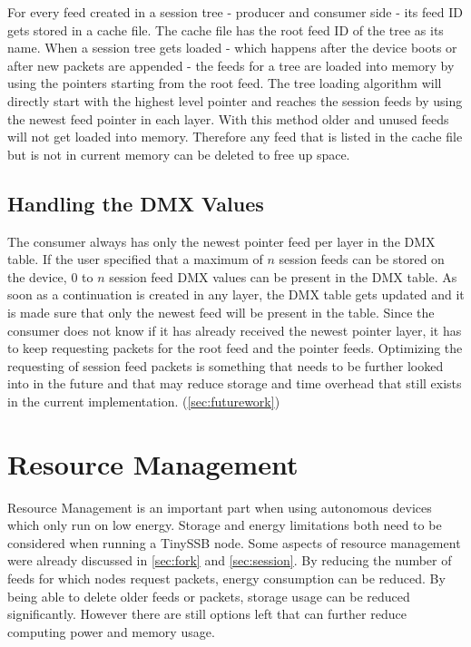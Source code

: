 For every feed created in a session tree - producer and consumer side - its feed ID gets stored in a cache file. The cache file has the root feed ID of the tree as its name. When a session tree gets loaded - which happens after the device boots or after new packets are appended - the feeds for a tree are loaded into memory by using the pointers starting from the root feed. The tree loading algorithm will directly start with the highest level pointer and reaches the session feeds by using the newest feed pointer in each layer. With this method older and unused feeds will not get loaded into memory. Therefore any feed that is listed in the cache file but is not in current memory can be deleted to free up space.


\subsection{Handling the DMX Values}
The consumer always has only the newest pointer feed per layer in the DMX table. If the user specified that a maximum of $n$ session feeds can be stored on the device, 0 to $n$ session feed DMX values can be present in the DMX table. As soon as a continuation is created in any layer, the DMX table gets updated and it is made sure that only the newest feed will be present in the table. Since the consumer does not know if it has already received the newest pointer layer, it has to keep requesting packets for the root feed and the pointer feeds. Optimizing the requesting of session feed packets is something that needs to be further looked into in the future and that may reduce storage and time overhead that still exists in the current implementation. (\cref{sec:futurework})

\newpage

\section{Resource Management}
Resource Management is an important part when using autonomous devices which only run on low energy. Storage and energy limitations both need to be considered when running a TinySSB node. Some aspects of resource management were already discussed in \cref{sec:fork} and \cref{sec:session}. By reducing the number of feeds for which nodes request packets, energy consumption can be reduced. By being able to delete older feeds or packets, storage usage can be reduced significantly.
However there are still options left that can further reduce computing power and memory usage.

